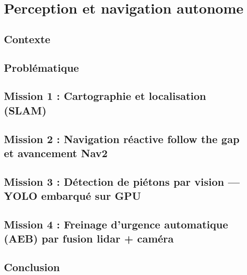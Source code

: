 \chapter{Perception et navigation autonome}
\chapminitoc
\label{chap:perception}

\section{Contexte}

\section{Problématique}

\section{Mission 1 : Cartographie et localisation (SLAM)}
\objectif
\methodes
\resultats
\discussion

\section{Mission 2 : Navigation réactive follow the gap et avancement Nav2}
\objectif
\methodes
\resultats
\discussion

\section{Mission 3 : Détection de piétons par vision --- YOLO embarqué sur GPU}
\objectif
\methodes
\resultats
\discussion

\section{Mission 4 : Freinage d'urgence automatique (AEB) par fusion lidar + caméra}
\objectif
\methodes
\resultats
\discussion

\section{Conclusion}
